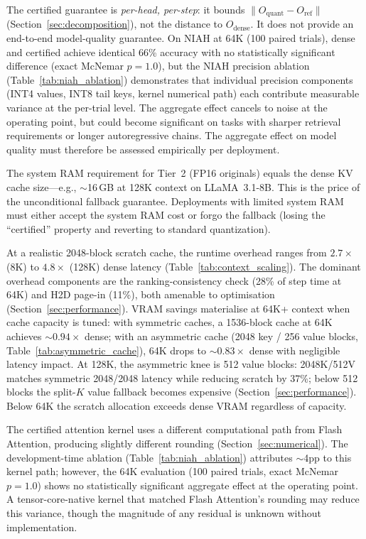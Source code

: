 \documentclass[10pt,twocolumn,a4paper]{article}
\theoremstyle{definition}
\theoremstyle{remark}
\newcommand{\norm}[1]{\lVert #1 \rVert}
\begin{document}
The certified guarantee is \emph{per-head, per-step}: it bounds $\norm{O_{\mathrm{quant}} - O_{\mathrm{ref}}}$ (Section~\ref{sec:decomposition}), not the distance to $O_{\mathrm{dense}}$.  It does not provide an end-to-end model-quality guarantee.  On NIAH at 64K (100 paired trials), dense and certified achieve identical 66\% accuracy with no statistically significant difference (exact McNemar $p{=}1.0$), but the NIAH precision ablation (Table~\ref{tab:niah_ablation}) demonstrates that individual precision components (INT4 values, INT8 tail keys, kernel numerical path) each contribute measurable variance at the per-trial level.  The aggregate effect cancels to noise at the operating point, but could become significant on tasks with sharper retrieval requirements or longer autoregressive chains.  The aggregate effect on model quality must therefore be assessed empirically per deployment.

The system RAM requirement for Tier~2 (FP16 originals) equals the dense KV cache size---e.g., $\sim$16\,GB at 128K context on LLaMA~3.1-8B.  This is the price of the unconditional fallback guarantee.  Deployments with limited system RAM must either accept the system RAM cost or forgo the fallback (losing the ``certified'' property and reverting to standard quantization).

At a realistic 2048-block scratch cache, the runtime overhead ranges from $2.7\times$ (8K) to $4.8\times$ (128K) dense latency (Table~\ref{tab:context_scaling}).  The dominant overhead components are the ranking-consistency check (28\% of step time at 64K) and H2D page-in (11\%), both amenable to optimisation (Section~\ref{sec:performance}).  VRAM savings materialise at 64K+ context when cache capacity is tuned: with symmetric caches, a 1536-block cache at 64K achieves ${\sim}0.94\times$ dense; with an asymmetric cache (2048 key / 256 value blocks, Table~\ref{tab:asymmetric_cache}), 64K drops to ${\sim}0.83\times$ dense with negligible latency impact.  At 128K, the asymmetric knee is 512 value blocks: 2048K/512V matches symmetric 2048/2048 latency while reducing scratch by 37\%; below 512 blocks the split-$K$ value fallback becomes expensive (Section~\ref{sec:performance}).  Below 64K the scratch allocation exceeds dense VRAM regardless of capacity.

The certified attention kernel uses a different computational path from Flash Attention, producing slightly different rounding (Section~\ref{sec:numerical}).  The development-time ablation (Table~\ref{tab:niah_ablation}) attributes $\sim$4pp to this kernel path; however, the 64K evaluation (100 paired trials, exact McNemar $p{=}1.0$) shows no statistically significant aggregate effect at the operating point.  A tensor-core-native kernel that matched Flash Attention's rounding may reduce this variance, though the magnitude of any residual is unknown without implementation.
\end{document}
